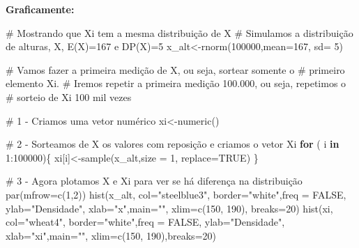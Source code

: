\documentclass[
  letterpaper,
  DIV=11,
  numbers=noendperiod]{scrartcl}
\newenvironment{Shaded}{\begin{snugshade}}{\end{snugshade}}
\newcommand{\AttributeTok}[1]{\textcolor[rgb]{0.40,0.45,0.13}{#1}}
\newcommand{\CommentTok}[1]{\textcolor[rgb]{0.37,0.37,0.37}{#1}}
\newcommand{\ConstantTok}[1]{\textcolor[rgb]{0.56,0.35,0.01}{#1}}
\newcommand{\ControlFlowTok}[1]{\textcolor[rgb]{0.00,0.23,0.31}{\textbf{#1}}}
\newcommand{\DecValTok}[1]{\textcolor[rgb]{0.68,0.00,0.00}{#1}}
\newcommand{\FunctionTok}[1]{\textcolor[rgb]{0.28,0.35,0.67}{#1}}
\newcommand{\NormalTok}[1]{\textcolor[rgb]{0.00,0.23,0.31}{#1}}
\newcommand{\OtherTok}[1]{\textcolor[rgb]{0.00,0.23,0.31}{#1}}
\newcommand{\SpecialCharTok}[1]{\textcolor[rgb]{0.37,0.37,0.37}{#1}}
\newcommand{\StringTok}[1]{\textcolor[rgb]{0.13,0.47,0.30}{#1}}
\begin{document}
\textbf{Graficamente:}

\begin{Shaded}
\begin{Highlighting}[]
\CommentTok{\# Mostrando que Xi tem a mesma distribuição de X}
 \CommentTok{\# Simulamos a distribuição de alturas, X, E(X)=167 e DP(X)=5}
\NormalTok{ x\_alt}\OtherTok{\textless{}{-}}\FunctionTok{rnorm}\NormalTok{(}\DecValTok{100000}\NormalTok{,}\AttributeTok{mean=}\DecValTok{167}\NormalTok{, }\AttributeTok{sd=} \DecValTok{5}\NormalTok{)}

 \CommentTok{\# Vamos fazer a primeira medição de X, ou seja, sortear somente o }
 \CommentTok{\# primeiro elemento Xi. }
   \CommentTok{\# Iremos repetir a primeira medição 100.000, ou seja, repetimos o }
   \CommentTok{\# sorteio de Xi 100 mil vezes}
   
\CommentTok{\# 1 {-} Criamos uma vetor numérico}
\NormalTok{xi}\OtherTok{\textless{}{-}}\FunctionTok{numeric}\NormalTok{()}

\CommentTok{\# 2 {-} Sorteamos de X os valores com reposição e criamos o vetor Xi}
\ControlFlowTok{for}\NormalTok{ ( i }\ControlFlowTok{in} \DecValTok{1}\SpecialCharTok{:}\DecValTok{100000}\NormalTok{)\{}
\NormalTok{  xi[i]}\OtherTok{\textless{}{-}}\FunctionTok{sample}\NormalTok{(x\_alt,}\AttributeTok{size =} \DecValTok{1}\NormalTok{, }\AttributeTok{replace=}\ConstantTok{TRUE}\NormalTok{)}
\NormalTok{\}  }

\CommentTok{\# 3 {-} Agora plotamos X e Xi para ver se há diferença na distribuição}
\FunctionTok{par}\NormalTok{(}\AttributeTok{mfrow=}\FunctionTok{c}\NormalTok{(}\DecValTok{1}\NormalTok{,}\DecValTok{2}\NormalTok{))}
\FunctionTok{hist}\NormalTok{(x\_alt, }\AttributeTok{col=}\StringTok{"steelblue3"}\NormalTok{, }\AttributeTok{border=}\StringTok{"white"}\NormalTok{,}\AttributeTok{freq =} \ConstantTok{FALSE}\NormalTok{, }\AttributeTok{ylab=}\StringTok{"Densidade"}\NormalTok{,}
     \AttributeTok{xlab=}\StringTok{"x"}\NormalTok{,}\AttributeTok{main=}\StringTok{""}\NormalTok{, }\AttributeTok{xlim=}\FunctionTok{c}\NormalTok{(}\DecValTok{150}\NormalTok{, }\DecValTok{190}\NormalTok{), }\AttributeTok{breaks=}\DecValTok{20}\NormalTok{)}
\FunctionTok{hist}\NormalTok{(xi, }\AttributeTok{col=}\StringTok{"wheat4"}\NormalTok{, }\AttributeTok{border=}\StringTok{"white"}\NormalTok{,}\AttributeTok{freq =} \ConstantTok{FALSE}\NormalTok{, }\AttributeTok{ylab=}\StringTok{"Densidade"}\NormalTok{,}
     \AttributeTok{xlab=}\StringTok{"xi"}\NormalTok{,}\AttributeTok{main=}\StringTok{""}\NormalTok{, }\AttributeTok{xlim=}\FunctionTok{c}\NormalTok{(}\DecValTok{150}\NormalTok{, }\DecValTok{190}\NormalTok{),}\AttributeTok{breaks=}\DecValTok{20}\NormalTok{)}
\end{Highlighting}
\end{Shaded}
\end{document}
